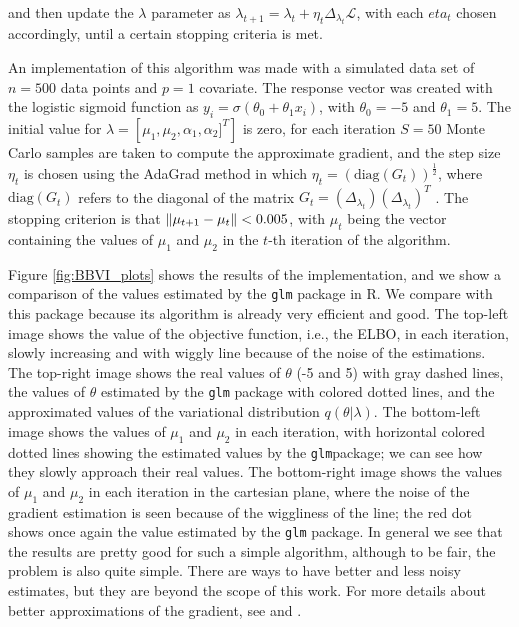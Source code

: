 and then update the $\lambda$ parameter as $\lambda_{t+1} = \lambda_{t} + \eta_t  \Delta_{\lambda_t} \mathcal{L}$, with each $eta_t$ chosen accordingly, until a certain stopping criteria is met.

An implementation of this algorithm was made with a simulated data set of $n = 500$ data points and $p = 1$ covariate. The response vector was created with the logistic sigmoid function as $y_i = \sigma(\theta_0 + \theta_1 x_i)$, with $\theta_0 = -5$ and $\theta_1 = 5$. The initial value for $\lambda = \left[ \mu_1, \mu_2, \alpha_1, \alpha_2 ]^T \right]$ is zero, for each iteration $S = 50$ Monte Carlo samples are taken to compute the approximate gradient, and the step size $\eta_t$ is chosen using the AdaGrad method in which
$\eta_t = \left( \mathrm{diag}(G_t) \right)^{\frac{1}{2}}$, where $\mathrm{diag}(G_t)$ refers to the diagonal of the matrix $G_t = \left( \Delta_{\lambda_t} \right) \left( \Delta_{\lambda_t} \right)^T$ \cite{duchi2011adaptive}. The stopping criterion is that
$\left\lVert \mu_{t+1} - \mu_{t} \right\rVert < 0.005$,
with $\mu_t$ being the vector containing the values of $\mu_1$ and $\mu_2$ in the $t$-th iteration of the algorithm.


Figure \ref{fig:BBVI_plots} shows the results of the implementation, and we show a comparison of the values estimated by the \texttt{glm} package in R. We compare with this package because its algorithm is already very efficient and good. The top-left image shows the value of the objective function, i.e., the ELBO, in each iteration, slowly increasing and with wiggly line because of the noise of the estimations. The top-right image shows the real values of $\theta$ (-5 and 5) with gray dashed lines, the values of $\theta$ estimated by the \texttt{glm} package with colored dotted lines, and the approximated values of the variational distribution $q(\theta | \lambda)$. The bottom-left image shows the values of $\mu_1$ and $\mu_2$ in each iteration, with horizontal colored dotted lines showing the estimated values by the \texttt{glm}package; we can see how they slowly approach their real values. The bottom-right image shows the values of $\mu_1$ and $\mu_2$ in each iteration in the cartesian plane, where the noise of the gradient estimation is seen because of the wiggliness of the line; the red dot shows once again the value estimated by the \texttt{glm} package. In general we see that the results are pretty good for such a simple algorithm, although to be fair, the problem is also quite simple. There are ways to have better and less noisy estimates, but they are beyond the scope of this work. For more details about better approximations of the gradient, see \cite{kucukelbir2017automatic} and \cite{ranganath2014black}.

